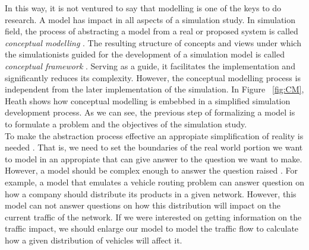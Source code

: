 \documentclass{report}
\begin{document}
In this way, it is not ventured to say that modelling is one of the keys to do research. A model has impact in all aspects of a simulation study. 
In simulation field, the process of abstracting a model from a real or proposed system is called \textit{conceptual modelling} \cite{Robinson2008}. 
The resulting structure of concepts and views under which the simulationists guided for the development of a simulation model is called 
\textit{conceptual framework} \cite{Balci1988}. Serving as a guide, it facilitates the implementation and significantly reduces its complexity.
However, the conceptual modelling process is independent from the later implementation of the simulation.
In Figure ~\ref{fig:CM}, Heath \cite{Heath2009} shows how conceptual modelling is embebbed in a simplified simulation development process.
As we can see, the previous step of formalizing a model is to formulate a problem and the objectives of the simulation study.\\

To make the abstraction process effective an appropiate simplification of reality is needed \cite{Pidd2003}. That is, we need to set the 
boundaries of the real world portion we want to model in an appropiate that can give answer to the question we want to make. 
However, a model should be complex enough to answer the question raised \cite{Banks1998}. For example, a model that emulates a vehicle routing
problem can answer question on how a company should distribute its products in a given network. However, this model can not answer questions
on how this distribution will impact on the current traffic of the network. If we were interested on getting information on the traffic impact,
we should enlarge our model to model the traffic flow to calculate how a given distribution of vehicles will affect it.  \\
\end{document}
